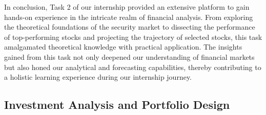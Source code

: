 In conclusion, Task 2 of our internship provided an extensive platform to gain hands-on experience in the intricate realm of financial analysis. From exploring the theoretical foundations of the security market to dissecting the performance of top-performing stocks and projecting the trajectory of selected stocks, this task amalgamated theoretical knowledge with practical application. The insights gained from this task not only deepened our understanding of financial markets but also honed our analytical and forecasting capabilities, thereby contributing to a holistic learning experience during our internship journey.

\subsection{Investment Analysis and Portfolio Design}

